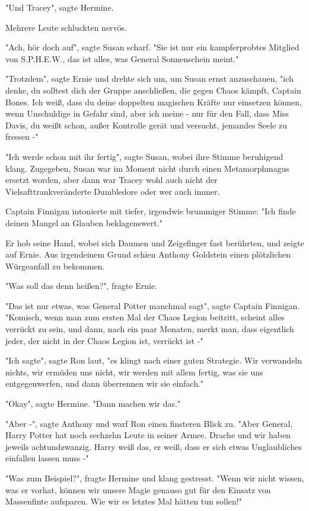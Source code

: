 {"Und Tracey", sagte Hermine.

Mehrere Leute schluckten nervös.

"Ach, hör doch auf", sagte Susan scharf. "Sie ist nur ein kampferprobtes Mitglied von S.P.H.E.W., das ist alles, was General Sonnenschein meint."

"Trotzdem", sagte Ernie und drehte sich um, um Susan ernst anzuschauen, "ich denke, du solltest dich der Gruppe anschließen, die gegen Chaos kämpft, Captain Bones. Ich weiß, dass du deine doppelten magischen Kräfte nur einsetzen können, wenn Unschuldige in Gefahr sind, aber ich meine - nur für den Fall, dass Miss Davis, du weißt schon, außer Kontrolle gerät und versucht, jemandes Seele zu fressen -"

"Ich werde schon mit ihr fertig", sagte Susan, wobei ihre Stimme beruhigend klang. Zugegeben, Susan war im Moment nicht durch einen Metamorphmagus ersetzt worden, aber dann war Tracey wohl auch nicht der Vielsafttrankveränderte Dumbledore oder wer auch immer.

Captain Finnigan intonierte mit tiefer, irgendwie brummiger Stimme: "Ich finde deinen Mangel an Glauben beklagenswert."

Er hob seine Hand, wobei sich Daumen und Zeigefinger fast berührten, und zeigte auf Ernie. Aus irgendeinem Grund schien Anthony Goldstein einen plötzlichen Würgeanfall zu bekommen.

"Was soll das denn heißen?", fragte Ernie.

"Das ist nur etwas, was General Potter manchmal sagt", sagte Captain Finnigan. "Komisch, wenn man zum ersten Mal der Chaos Legion beitritt, scheint alles verrückt zu sein, und dann, nach ein paar Monaten, merkt man, dass eigentlich jeder, der nicht in der Chaos Legion ist, verrückt ist -"

"Ich sagte", sagte Ron laut, "es klingt nach einer guten Strategie. Wir verwandeln nichts, wir ermüden uns nicht, wir werden mit allem fertig, was sie uns entgegenwerfen, und dann überrennen wir sie einfach."

"Okay", sagte Hermine. "Dann machen wir das."

"Aber -", sagte Anthony und warf Ron einen finsteren Blick zu. "Aber General, Harry Potter hat noch sechzehn Leute in seiner Armee. Drache und wir haben jeweils achtundzwanzig. Harry weiß das, er weiß, dass er sich etwas Unglaubliches einfallen lassen muss -"

"Was zum Beispiel?", fragte Hermine und klang gestresst. "Wenn wir nicht wissen, was er vorhat, können wir unsere Magie genauso gut für den Einsatz von Massenfinte aufsparen. Wie wir es letztes Mal hätten tun sollen!"

}
